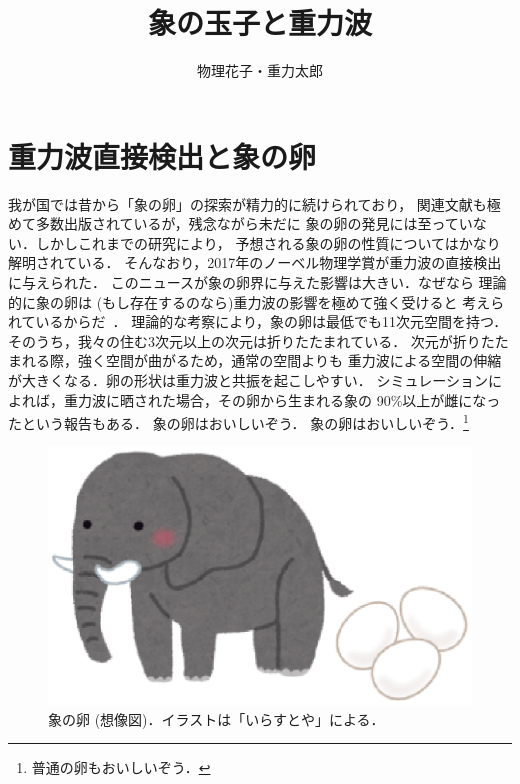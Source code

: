 \documentclass[b5paper,papersize,twocolumn]{jsarticle}
\title{象の玉子と重力波}
\author{物理花子・重力太郎}
\begin{document}
\maketitle

\section{重力波直接検出と象の卵}

我が国では昔から「象の卵」の探索が精力的に続けられており，
関連文献も極めて多数出版されているが，残念ながら未だに
象の卵の発見には至っていない．しかしこれまでの研究により，
予想される象の卵の性質についてはかなり解明されている．
そんなおり，2017年のノーベル物理学賞が重力波の直接検出に与えられた．
このニュースが象の卵界に与えた影響は大きい．なぜなら
理論的に象の卵は (もし存在するのなら)重力波の影響を極めて強く受けると
考えられているからだ~\cite{elephant}．
理論的な考察により，象の卵は最低でも11次元空間を持つ．
そのうち，我々の住む3次元以上の次元は折りたたまれている．
次元が折りたたまれる際，強く空間が曲がるため，通常の空間よりも
重力波による空間の伸縮が大きくなる．卵の形状は重力波と共振を起こしやすい．
シミュレーションによれば，重力波に晒された場合，その卵から生まれる象の
90\%以上が雌になったという報告もある．
象の卵はおいしいぞう．
象の卵はおいしいぞう．\footnote{%
普通の卵もおいしいぞう．
}

\begin{figure}[tb]
\centering
\includegraphics[width=\linewidth]{eggphant.eps}
\caption{象の卵 (想像図)．イラストは「いらすとや」による．}
\label{fig_eggphant}
\end{figure}
\end{document}
